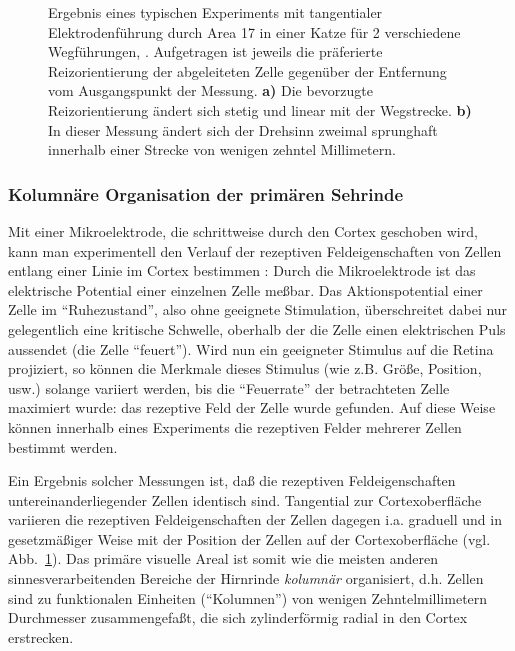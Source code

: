 \begin{figure}[p]
\begin{center}
\begin{minipage}[m]{5.5cm}
\end{minipage}
\hskip1cm
\begin{minipage}[m]{5.5cm}
\end{minipage}
\end{center}
\caption{Ergebnis eines typischen Experiments mit tangentialer
Elektrodenführung durch Area 17 in einer Katze für 2 verschiedene
Wegführungen, \protect{}.  Aufgetragen ist
jeweils die präferierte Reizorientierung der abgeleiteten Zelle gegenüber
der Entfernung vom Ausgangspunkt der Messung.  \textbf{a)} Die bevorzugte
Reizorientierung ändert sich stetig und linear mit der Wegstrecke.
\textbf{b)} In dieser Messung ändert sich der Drehsinn zweimal sprunghaft
innerhalb einer Strecke von wenigen zehntel Millimetern.}
\label{opelektrode}
\end{figure}

\subsubsection{Kolumnäre Organisation der primären Sehrinde}

Mit einer Mikroelektrode, die schrittweise durch den Cortex geschoben wird,
kann man experimentell den Verlauf der rezeptiven Feldeigenschaften von
Zellen entlang einer Linie im Cortex bestimmen
: Durch die  Mikroelektrode ist
das elektrische Potential einer einzelnen Zelle meßbar.  Das
Aktionspotential einer Zelle im ``Ruhezustand'', also ohne geeignete
Stimulation, überschreitet dabei nur gelegentlich eine kritische Schwelle,
oberhalb der die Zelle einen elektrischen Puls aussendet (die Zelle
``feuert'').  Wird nun ein geeigneter Stimulus auf die Retina projiziert,
so können die Merkmale dieses Stimulus (wie z.B. Größe, Position, usw.)
solange variiert werden, bis die ``Feuerrate'' der betrachteten Zelle
maximiert wurde: das rezeptive Feld der Zelle wurde gefunden.  Auf diese
Weise können innerhalb eines Experiments die rezeptiven Felder mehrerer
Zellen bestimmt werden.

Ein Ergebnis solcher Messungen ist, daß die rezeptiven Feldeigenschaften
untereinanderliegender Zellen identisch sind. Tangential zur
Cortexoberfläche variieren die rezeptiven Feldeigenschaften der Zellen
dagegen i.a. graduell und in gesetzmäßiger Weise mit der Position der
Zellen auf der Cortexoberfläche (vgl. Abb.~\ref{opelektrode}).  Das
primäre visuelle Areal ist somit wie die meisten anderen
sinnesverarbeitenden Bereiche der Hirnrinde \emph{kolumnär} organisiert,
d.h.  Zellen sind zu funktionalen Einheiten (``Kolumnen'') von wenigen
Zehntelmillimetern Durchmesser zusammengefaßt, die sich zylinderförmig
radial in den Cortex erstrecken.

